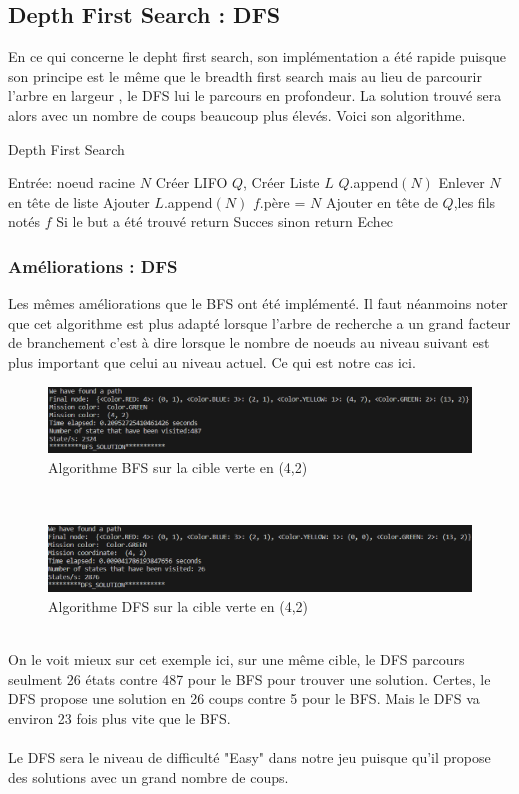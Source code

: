 \documentclass{article}
\begin{document}
\subsection{Depth First Search : DFS}
En ce qui concerne le depht first search, son implémentation a été rapide puisque son principe est le même que le breadth first search mais au lieu de parcourir l'arbre en largeur , le DFS lui le parcours en profondeur. La solution trouvé sera alors avec un nombre de coups beaucoup plus élevés. Voici son algorithme.
\begin{algorithm}[H]
\caption{Depth First Search}
\label{alg:dfs-reach}
\begin{algorithmic}[2]
  \STATE Entrée: noeud racine $N$
  \STATE Créer LIFO $Q$, Créer Liste $L$
  \STATE $Q$.append$(N)$
    \STATE Enlever $N$ en tête de liste
    \STATE Ajouter $L$.append$(N)$
      \STATE $f$.père = $N$
      \STATE Ajouter en tête de $Q$,les fils notés $f$
    \ENDFOR
  \ENDWHILE
  \STATE Si le but a été trouvé return Succes sinon return Echec
\end{algorithmic}
\end{algorithm}
\subsubsection{Améliorations : DFS}
Les mêmes améliorations que le BFS ont été implémenté. Il faut néanmoins noter que cet algorithme est plus adapté lorsque l'arbre de recherche a un grand facteur de branchement c'est à dire lorsque le nombre de noeuds au niveau suivant est plus important que celui au niveau actuel. Ce qui est notre cas ici.
\begin{figure}[!h]
  \centering  
  \includegraphics[width=1\textwidth]{bfs_solution_green.png}  
  \caption{Algorithme BFS sur la cible verte en (4,2)} 
  \label{fig:Diagram}  
\end{figure}\\
\begin{figure}[!h]
  \centering  
  \includegraphics[width=1\textwidth]{dfs_solution_green.png}  
  \caption{Algorithme DFS sur la cible verte en (4,2)} 
  \label{fig:Diagram}  
\end{figure}\\
On le voit mieux sur cet exemple ici, sur une même cible, le DFS parcours seulment 26 états contre 487 pour le BFS pour trouver une solution. Certes, le DFS propose une solution en 26 coups contre 5 pour le BFS. Mais le DFS va environ 23 fois plus vite que le BFS.\\\\
Le DFS sera le niveau de difficulté "Easy" dans notre jeu puisque qu'il propose des solutions avec un grand nombre de coups.
\end{document}
